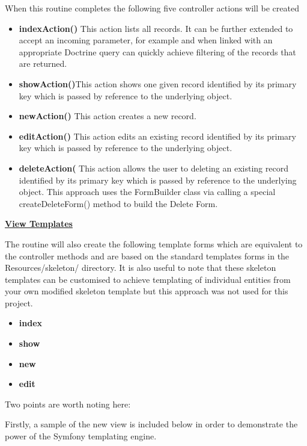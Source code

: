 \documentclass[a4paper,Times New Roman 11pt]{article}
\begin{document}
When this routine completes the following five controller actions will be created
\begin {itemize}

\item \textbf{indexAction()} This action lists all records. It can be further extended to accept an incoming parameter, for example and when linked with an appropriate Doctrine query can quickly achieve filtering of the records that are returned.
\item \textbf{showAction()}This action shows one given record identified by its primary key which is passed by reference to the underlying object.
\item \textbf {newAction()} This action creates a new record.
\item \textbf{editAction()} This action edits an existing record identified by its primary key which is passed by reference to the underlying object.
\item \textbf{deleteAction(} This action allows the user to deleting an existing record identified by its primary key which is passed by reference to the underlying object. This approach uses the FormBuilder class via calling a special createDeleteForm() method  to build the Delete Form.

\end {itemize}

\textbf {\underline{View Templates}}

The routine will also create the following template forms which are equivalent to the controller methods and are based on the standard templates forms in the Resources/skeleton/ directory. It is also useful to note that these skeleton templates can be customised to achieve templating of individual entities from your own modified skeleton template but this approach was not used for this project.
\begin {itemize}

\item \textbf{index} 
\item \textbf{show}
\item \textbf{new} 
\item \textbf{edit} 
\end {itemize}

Two points are worth noting here:

Firstly, a sample of the new view is included below in order to demonstrate the power of the Symfony templating engine.
\end{document}
